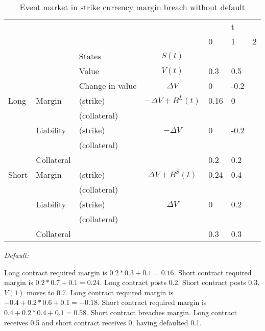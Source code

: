 \documentclass[12pt]{article}
\begin{document}
\begin{table}
\begin{tabular}{lll|c|lll}
&  &  &  &  & t &\\  
&  &  &  & 0 & 1 & 2\\
\hline
\hline
&  & States &  $S(t)$ &   &   & \\
&  & Value  &  $V(t)$  & 0.3 & 0.5 &  \\
&  & Change in value & $\Delta V$ & 0& -0.2 &  \\
\hline
Long      & Margin    & (strike)     & $-\Delta V + B^L(t)$& 0.16 & 0 & \\
          &           & (collateral) & & & &\\ 
          & Liability & (strike)     & $-\Delta V$ & 0 & -0.2 & \\ 
          &           & (collateral)& & & &\\
          & Collateral&                       &    & 0.2 & 0.2 & \\
\hline          
Short     & Margin    & (strike)     & $\Delta V + B^S(t)$ & 0.24 & 0.4 & \\
          &           & (collateral) & & & &\\
          & Liability & (strike)     & $\Delta V$ & 0 & 0.2 &\\
          &           & (collateral) & & & &\\
          & Collateral&                       &    & 0.3 & 0.3 & \\ 
          

\end{tabular}
\caption{Event market in strike currency margin breach without default}
\label{fut}
\end{table}


\textit{Default:}

Long contract required margin is $0.2*0.3 +0.1 = 0.16$.  Short contract required margin is $0.2*0.7 +0.1 = 0.24$. Long contract posts 0.2. Short contract posts 0.3. $V(1)$ moves to 0.7. Long contract required margin is $-0.4+0.2*0.6 + 0.1 = -0.18$. Short contract required margin is $0.4+0.2*0.4 + 0.1 = 0.58$. Short contract breaches margin. Long contract receives 0.5 and short contract receives $0$, having defaulted 0.1.
\end{document}
